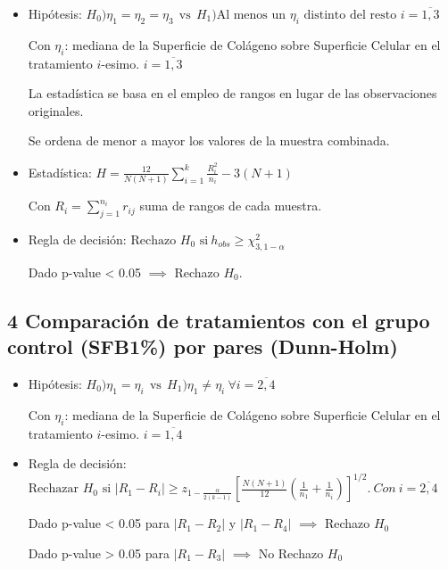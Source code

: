 \documentclass[
  11pt,
]{article}
\begin{document}
\begin{itemize}
\item
  Hipótesis:
  \(H_0) \eta_1 = \eta_2 = \eta_3 \ \ \text{vs} \ \ H_1) \text{Al menos un } \eta_i \text{ distinto del resto } i=\overline{1,3}\)

  Con \(\eta_i\): mediana de la Superficie de Colágeno sobre Superficie
  Celular en el tratamiento \(i\)-esimo. \(i = \overline{1,3}\)

  La estadística se basa en el empleo de rangos en lugar de las
  observaciones originales.

  Se ordena de menor a mayor los valores de la muestra combinada.
\item
  Estadística:
  \(H = \frac{12}{N(N+1)} \sum_{i=1}^{k} \frac{R_i^2}{n_i} - 3(N+1)\)

  Con \(R_i = \sum_{j=1}^{n_i}r_{ij}\) suma de rangos de cada muestra.
\item
  Regla de decisión:
  \(\text{Rechazo } H_0 \text{ si} \ h_{obs} \geq \chi_{3, 1 - \alpha}^2\)

  Dado p-value \textless{} 0.05 \(\implies\) Rechazo \(H_0\).
\end{itemize}

\subsection{4 Comparación de tratamientos con el grupo control (SFB1\%)
por pares
(Dunn-Holm)}\label{comparaciuxf3n-de-tratamientos-con-el-grupo-control-sfb1-por-pares-dunn-holm}

\begin{itemize}
\item
  Hipótesis:
  \(H_0) \eta_1 = \eta_i \ \ \text{vs} \ \ H_1) \eta_1 \neq \eta_i \ \forall i=\overline{2,4}\)

  Con \(\eta_i\): mediana de la Superficie de Colágeno sobre Superficie
  Celular en el tratamiento \(i\)-esimo. \(i = \overline{1,4}\)
\item
  Regla de decisión:
  \(\text{Rechazar } H_0 \text{ si } |R_1 - R_i| \ge z_{1 - \frac{\alpha}{2(k-1)}} \left[ \frac{N(N+1)}{12} \left( \frac{1}{n_1} + \frac{1}{n_i} \right) \right]^{1/2}. \ Con \ i =\overline{2,4}\)

  Dado p-value \textless{} 0.05 para \(|R_1 - R_2|\) y \(|R_1 - R_4|\)
  \(\implies\) Rechazo \(H_0\)

  Dado p-value \textgreater{} 0.05 para \(|R_1 - R_3|\) \(\implies\) No
  Rechazo \(H_0\)
\end{itemize}
\end{document}
